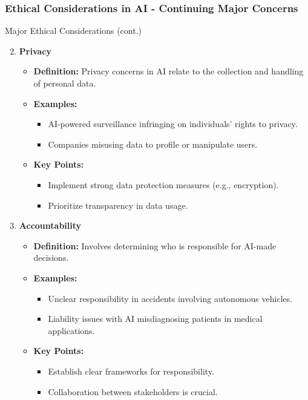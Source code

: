\documentclass{beamer}
\begin{document}
\begin{frame}[fragile]
    \frametitle{Ethical Considerations in AI - Continuing Major Concerns}
    \begin{block}{Major Ethical Considerations (cont.)}
        \begin{enumerate}
            \setcounter{enumi}{1} %
            \item \textbf{Privacy}
            \begin{itemize}
                \item \textbf{Definition:} Privacy concerns in AI relate to the collection and handling of personal data.
                \item \textbf{Examples:}
                \begin{itemize}
                    \item AI-powered surveillance infringing on individuals' rights to privacy.
                    \item Companies misusing data to profile or manipulate users.
                \end{itemize}
                \item \textbf{Key Points:}
                \begin{itemize}
                    \item Implement strong data protection measures (e.g., encryption).
                    \item Prioritize transparency in data usage.
                \end{itemize}
            \end{itemize}
            \item \textbf{Accountability}
            \begin{itemize}
                \item \textbf{Definition:} Involves determining who is responsible for AI-made decisions.
                \item \textbf{Examples:}
                \begin{itemize}
                    \item Unclear responsibility in accidents involving autonomous vehicles.
                    \item Liability issues with AI misdiagnosing patients in medical applications.
                \end{itemize}
                \item \textbf{Key Points:}
                \begin{itemize}
                    \item Establish clear frameworks for responsibility.
                    \item Collaboration between stakeholders is crucial.
                \end{itemize}
            \end{itemize}
        \end{enumerate}
    \end{block}
\end{frame}
\end{document}
